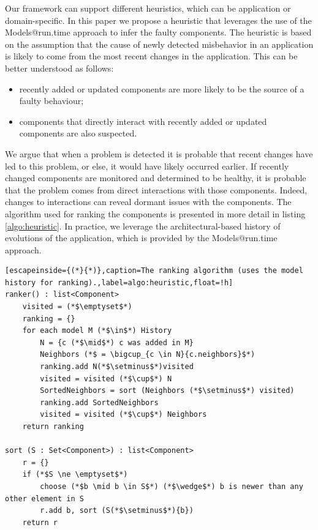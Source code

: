 Our framework can support different heuristics, which can be application or domain-specific.
In this paper we propose a heuristic that leverages the use of the Models@run.time approach to infer the faulty components.
The heuristic is based on the assumption that the cause of newly detected misbehavior in an application is likely to come from the most recent changes in the application.
This can be better understood as follows:
\begin{itemize}
\leftskip -.2in
  \item recently added or updated components are more likely to be the source of a faulty behaviour;
  \item components that directly interact with recently added or updated components are also suspected.
\end{itemize}

We argue that when a problem is detected it is probable that recent changes have led to this problem, or else, it would have likely occurred earlier.
If recently changed components are monitored and determined to be healthy, it is probable that the problem comes from direct interactions with those components.
Indeed, changes to interactions can reveal dormant issues with the components.
The algorithm used for ranking the components is presented in more detail in listing \ref{algo:heuristic}.
In practice, we leverage the architectural-based history of evolutions of the application, which is provided by the Models@run.time approach.


\begin{lstlisting}[escapeinside={(*}{*)},caption=The ranking algorithm (uses the model history for ranking).,label=algo:heuristic,float=!h]
ranker() : list<Component>
	visited = (*$\emptyset$*)
	ranking = {}
	for each model M (*$\in$*) History
		N = {c (*$\mid$*) c was added in M}
		Neighbors (*$ = \bigcup_{c \in N}{c.neighbors}$*)
		ranking.add N(*$\setminus$*)visited
		visited = visited (*$\cup$*) N
		SortedNeighbors = sort (Neighbors (*$\setminus$*) visited)
		ranking.add SortedNeighbors
		visited = visited (*$\cup$*) Neighbors
	return ranking
	
sort (S : Set<Component>) : list<Component>
	r = {}
	if (*$S \ne \emptyset$*)
		choose (*$b \mid b \in S$*) (*$\wedge$*) b is newer than any other element in S
		r.add b, sort (S(*$\setminus$*){b})
	return r
\end{lstlisting}
